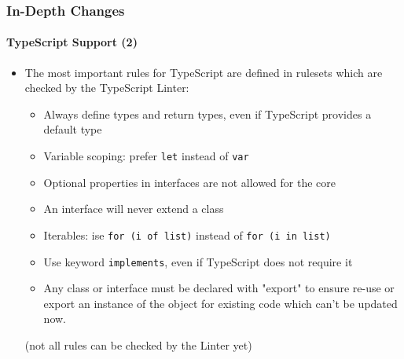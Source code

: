 \begin{frame}[fragile]
	\frametitle{In-Depth Changes}
	\framesubtitle{TypeScript Support (2)}

	\begin{itemize}
		\item The most important rules for TypeScript are defined in rulesets which are checked by the TypeScript Linter:

			\begin{itemize}
				\item Always define types and return types, even if TypeScript provides a default type
				\item Variable scoping: prefer \texttt{let} instead of \texttt{var}
				\item Optional properties in interfaces are not allowed for the core
				\item An interface will never extend a class
				\item Iterables: ise \texttt{for (i of list)} instead of \texttt{for (i in list)}
				\item Use keyword \texttt{implements}, even if TypeScript does not require it
				\item Any class or interface must be declared with "export" to ensure re-use or export an instance of the object for existing code which can't be updated now.
			\end{itemize}

			\small(not all rules can be checked by the Linter yet)\normalsize

	\end{itemize}

\end{frame}



